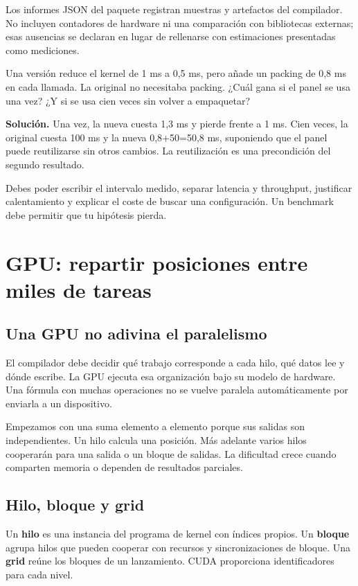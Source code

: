 \documentclass[12pt,a4paper,oneside]{report}
\begin{document}
Los informes JSON del paquete registran muestras y artefactos del compilador. No incluyen contadores de hardware ni una comparación con bibliotecas externas; esas ausencias se declaran en lugar de rellenarse con estimaciones presentadas como mediciones.

\begin{practica}
Una versión reduce el kernel de 1 ms a 0,5 ms, pero añade un packing de 0,8 ms en cada llamada. La original no necesitaba packing. ¿Cuál gana si el panel se usa una vez? ¿Y si se usa cien veces sin volver a empaquetar?

\end{practica}
\textbf{Solución.} Una vez, la nueva cuesta 1,3 ms y pierde frente a 1 ms. Cien veces, la original cuesta 100 ms y la nueva 0,8+50=50,8 ms, suponiendo que el panel puede reutilizarse sin otros cambios. La reutilización es una precondición del segundo resultado.

\begin{comprueba}
Debes poder escribir el intervalo medido, separar latencia y throughput, justificar calentamiento y explicar el coste de buscar una configuración. Un benchmark debe permitir que tu hipótesis pierda.

\end{comprueba}

\chapter{GPU: repartir posiciones entre miles de tareas}
\label{ch:gpu}
\section{Una GPU no adivina el paralelismo}
El compilador debe decidir qué trabajo corresponde a cada hilo, qué datos lee y dónde escribe. La GPU ejecuta esa organización bajo su modelo de hardware. Una fórmula con muchas operaciones no se vuelve paralela automáticamente por enviarla a un dispositivo.

Empezamos con una suma elemento a elemento porque sus salidas son independientes. Un hilo calcula una posición. Más adelante varios hilos cooperarán para una salida o un bloque de salidas. La dificultad crece cuando comparten memoria o dependen de resultados parciales.

\section{Hilo, bloque y grid}
Un \textbf{hilo} es una instancia del programa de kernel con índices propios. Un \textbf{bloque} agrupa hilos que pueden cooperar con recursos y sincronizaciones de bloque. Una \textbf{grid} reúne los bloques de un lanzamiento. CUDA proporciona identificadores para cada nivel. \cite{cuda}
\end{document}
